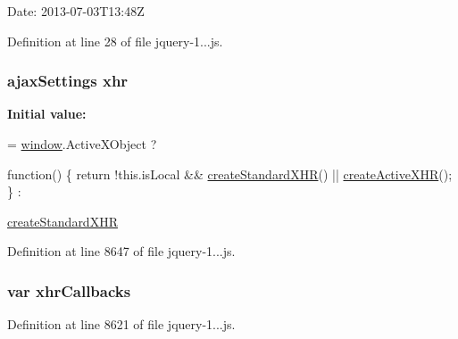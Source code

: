 Date\+: 2013-\/07-\/03\+T13\+:48Z 

Definition at line 28 of file jquery-\/1...\+js.

\subsubsection[{\texorpdfstring{xhr}{xhr}}]{ ajax\+Settings xhr}\hypertarget{_scripts_2jquery-1_810_82_8js_a0b7a5cb538ca9913b1b3b1c807ad06f0}{}\label{_scripts_2jquery-1_810_82_8js_a0b7a5cb538ca9913b1b3b1c807ad06f0}
{\bfseries Initial value\+:}
\begin{DoxyCode}
= \hyperlink{obj_2_release_2_package_2_package_tmp_2_scripts_2jquery-1_810_82_8js_a04a8a2bbfa9c15500892b8e5033d625b}{window}.ActiveXObject ?
    
    \textcolor{keyword}{function}() \{
        \textcolor{keywordflow}{return} !this.isLocal && \hyperlink{obj_2_release_2_package_2_package_tmp_2_scripts_2jquery-1_810_82_8js_acea019a8b67e4d114deb75d1e0b3474a}{createStandardXHR}() || 
      \hyperlink{obj_2_release_2_package_2_package_tmp_2_scripts_2jquery-1_810_82_8js_a54bf63f1b5f905292db45a1d6a9dc300}{createActiveXHR}();
    \} :
    
    \hyperlink{obj_2_release_2_package_2_package_tmp_2_scripts_2jquery-1_810_82_8js_acea019a8b67e4d114deb75d1e0b3474a}{createStandardXHR}
\end{DoxyCode}


Definition at line 8647 of file jquery-\/1...\+js.

\subsubsection[{\texorpdfstring{xhr\+Callbacks}{xhrCallbacks}}]{\setlength{\rightskip}{0pt plus 5cm}var xhr\+Callbacks}\hypertarget{_scripts_2jquery-1_810_82_8js_a068f27a70831ff3a9e0ffa79e063847f}{}\label{_scripts_2jquery-1_810_82_8js_a068f27a70831ff3a9e0ffa79e063847f}


Definition at line 8621 of file jquery-\/1...\+js.

